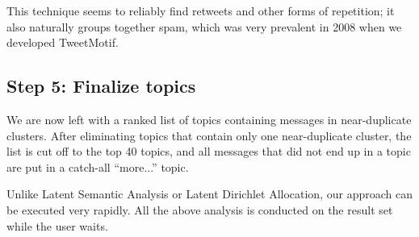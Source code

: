 \documentclass[letterpaper]{article}
\begin{document}
This technique seems to reliably find retweets and other forms of repetition; it also naturally groups together spam, which was very prevalent in 2008 when we developed TweetMotif.

\subsection{Step 5: Finalize topics}

We are now left with a ranked list of topics containing messages in near-duplicate clusters.  After eliminating topics that contain only one near-duplicate cluster, the list is cut off to the top 40 topics, and all messages that did not end up in a topic are put in a catch-all ``more...'' topic.

Unlike Latent Semantic Analysis or Latent Dirichlet Allocation, our approach can be executed very rapidly.  All the above analysis is conducted on the result set while the user waits.






\end{document}
